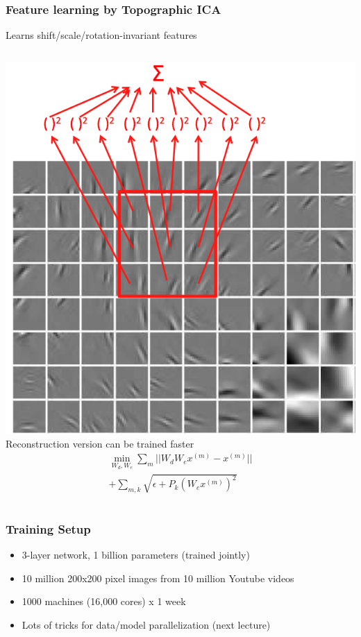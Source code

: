 \documentclass{beamer}
\newcommand{\bi}{\begin{itemize}}
\newcommand{\ei}{\end{itemize}}
\begin{document}
\begin{frame}
\frametitle{Feature learning by Topographic ICA \cite{hyvarinen01tica}}
Learns shift/scale/rotation-invariant features
\begin{columns}[c]
	\includegraphics[scale=0.25]{figs/topographic_ica}
	     Reconstruction version \cite{le11rica} can be trained faster
	\begin{eqnarray}
	\min_{W_d,W_e} \sum_m ||W_d W_e x^{(m)} - x^{(m)} || \nonumber  \\
	+ \sum_{m,k} \sqrt{\epsilon + P_k (W_e x^{(m)})^2}  \nonumber
	\end{eqnarray}
\end{columns}
\end{frame}

\begin{frame}
\frametitle{Training Setup}
\bi
\item 3-layer network, 1 billion parameters (trained jointly)
\item 10 million 200x200 pixel images from 10 million Youtube videos
\item 1000 machines (16,000 cores) x 1 week
\item Lots of tricks for data/model parallelization (next lecture)
\ei
\end{frame}
\end{document}

